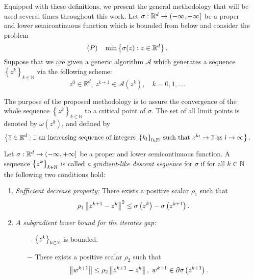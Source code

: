 Equipped with these definitions, we present the general methodology that will be used several times throughout this work. Let $\sigma : \mathbb{R}^d \rightarrow ( -\infty, +\infty ]$ be a proper and lower semicontinuous function which is bounded from below and consider the problem
\begin{equation*}
	(P) \quad \min \left\lbrace \sigma(z) : z \in \mathbb{R}^d \right\rbrace.
\end{equation*} 
Suppose that we are given a generic algorithm $\mathcal{A}$ which generates a sequence $\left\lbrace z^k \right\rbrace_{k \in \mathbb{N}}$ via the following scheme:
\begin{equation*}
	z^0 \in \mathbb{R}^d, \: z^{k+1} \in \mathcal{A}\left(z^k\right), \quad k=0,1,\ldots.
\end{equation*}

The purpose of the proposed methodology is to assure the convergence of the whole sequence $\left\lbrace z^k \right\rbrace_{k \in \mathbb{N}}$ to a critical point of $\sigma$. The set of all limit points is denoted by $\omega\left(z^0\right)$, and defined by
\begin{equation*}
	\left\lbrace \overline{z} \in \mathbb{R}^d : \exists \text{ an increasing sequence of integers } \left\lbrace k_l\right\rbrace_{l \in \mathbb{N}} \text{ such that } z^{k_l} \rightarrow \overline{z} \text{ as } l \rightarrow \infty \right\rbrace .
\end{equation*}

\begin{definition} \label{gradient_like_seq_def}
	Let $\sigma: \mathbb{R}^d \rightarrow (-\infty, +\infty]$ be a proper and lower semicontinuous function. A sequence $\left\lbrace z^k \right\rbrace_{k \in \mathbb{N}}$ is called \textit{a gradient-like descent sequence} for $\sigma$ if for all $k \in \mathbb{N}$ the following two conditions hold:
	\begin{enumerate}[(C1)]
		\item \textit{Sufficient decrease property:} There exists a positive scalar $\rho_1$ such that
		\begin{equation*}
			\rho_1 \left\Vert {z^{k+1} - z^k} \right\Vert^2 \leq \sigma\left( z^k \right) - \sigma \left( z^{k+1} \right) .
		\end{equation*}
		\item \textit{A subgradient lower bound for the iterates gap:}
		\begin{itemize}
			\item[$-$] $\left\lbrace z^k \right\rbrace_{k \in \mathbb{N}}$ is bounded.
			\item[$-$] There exists a positive scalar $\rho_2$ such that
			\begin{equation*}
				\left\Vert {w^{k+1}} \right\Vert \leq \rho_2 \left\Vert {z^{k+1} - z^k} \right\Vert, \; w^{k+1} \in \partial\sigma \left( z^{k+1}\right).
			\end{equation*}
		\end{itemize}
	\end{enumerate}
\end{definition}

